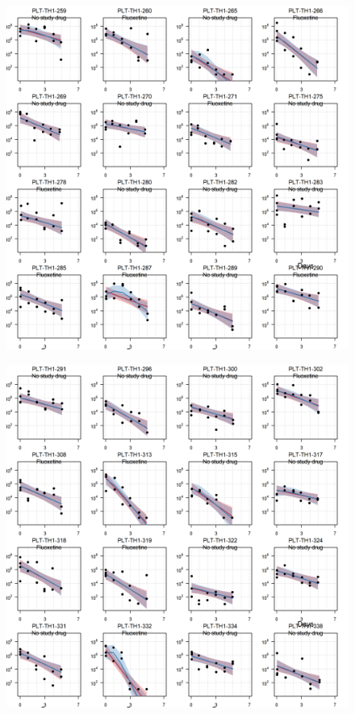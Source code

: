 \documentclass[
  letterpaper,
  DIV=11,
  numbers=noendperiod]{scrartcl}
\begin{document}
\begin{figure}[H]

{\centering \includegraphics{Fluoxetine_analysis_files/figure-pdf/individ_data-5.png}

}

\end{figure}

\begin{figure}[H]

{\centering \includegraphics{Fluoxetine_analysis_files/figure-pdf/individ_data-6.png}

}

\end{figure}
\end{document}
